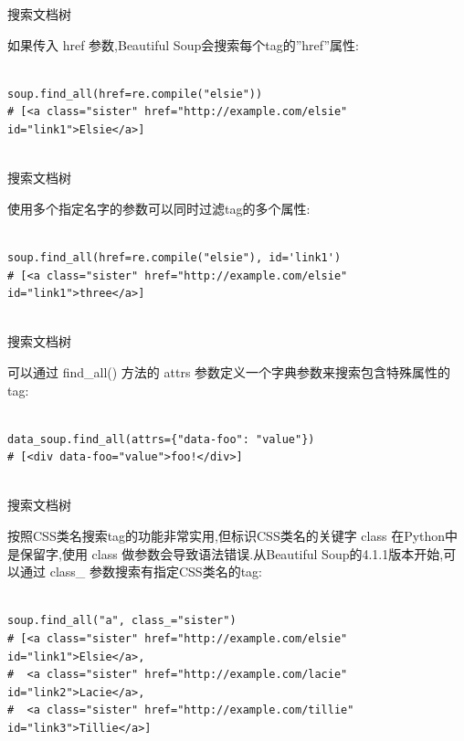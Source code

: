 \documentclass{beamer}
\begin{document}
\begin{frame}[t,fragile]{搜索文档树}

如果传入 href 参数,Beautiful Soup会搜索每个tag的”href”属性:

\begin{verbatim}

soup.find_all(href=re.compile("elsie"))
# [<a class="sister" href="http://example.com/elsie" id="link1">Elsie</a>]


\end{verbatim}


\end{frame}

\begin{frame}[t,fragile]{搜索文档树}

使用多个指定名字的参数可以同时过滤tag的多个属性:

\begin{verbatim}

soup.find_all(href=re.compile("elsie"), id='link1')
# [<a class="sister" href="http://example.com/elsie" id="link1">three</a>]


\end{verbatim}


\end{frame}

\begin{frame}[t,fragile]{搜索文档树}

可以通过 find\_all() 方法的 attrs 参数定义一个字典参数来搜索包含特殊属性的tag:

\begin{verbatim}

data_soup.find_all(attrs={"data-foo": "value"})
# [<div data-foo="value">foo!</div>]


\end{verbatim}


\end{frame}

\begin{frame}[t,fragile]{搜索文档树}

按照CSS类名搜索tag的功能非常实用,但标识CSS类名的关键字 class 在Python中是保留字,使用 class 做参数会导致语法错误.从Beautiful Soup的4.1.1版本开始,可以通过 class\_ 参数搜索有指定CSS类名的tag:

\scriptsize
\begin{verbatim}

soup.find_all("a", class_="sister")
# [<a class="sister" href="http://example.com/elsie" id="link1">Elsie</a>,
#  <a class="sister" href="http://example.com/lacie" id="link2">Lacie</a>,
#  <a class="sister" href="http://example.com/tillie" id="link3">Tillie</a>]


\end{verbatim}


\end{frame}
\end{document}
